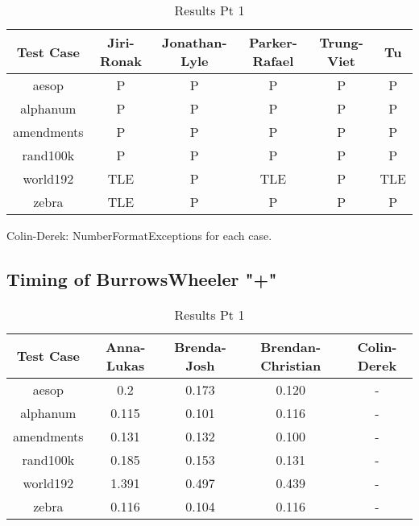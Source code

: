 \documentclass[12pt]{article}
\begin{document}
\begin{table}[ht]
\caption{Results Pt 1}%
\centering %
\begin{tabular}{c c c c c c}%
\hline \hline                        %
Test Case & Jiri-Ronak & Jonathan-Lyle & Parker-Rafael & Trung-Viet & Tu \\ [0.5ex]%
\hline                  %
aesop      & P   & P & P & P & P\\
alphanum   & P   & P & P   & P & P\\
amendments & P   & P & P & P & P \\
rand100k   & P   & P & P & P & P\\
world192   & TLE & P & TLE & P & TLE\\
zebra      & TLE & P & P   & P & P\\
\hline                  %
\end{tabular}
\label{table:nonlin}
\end{table}

Colin-Derek: NumberFormatExceptions for each case.



\newpage
\subsection{Timing of BurrowsWheeler "+"}
\begin{table}[ht]
\caption{Results Pt 1}%
\centering %
\begin{tabular}{c c c c c}%
\hline \hline

Test Case & Anna-Lukas & Brenda-Josh & Brendan-Christian & Colin-Derek \\ [0.5ex]%
\hline                  %
aesop      & 0.2   & 0.173 & 0.120 & - \\
alphanum   & 0.115 & 0.101 & 0.116 & - \\
amendments & 0.131 & 0.132 & 0.100 & - \\
rand100k   & 0.185 & 0.153 & 0.131 & - \\
world192   & 1.391 & 0.497 & 0.439 & - \\
zebra      & 0.116 & 0.104 & 0.116 & - \\
\hline                  %
\end{tabular}
\label{table:nonlin}
\end{table}
\end{document}
